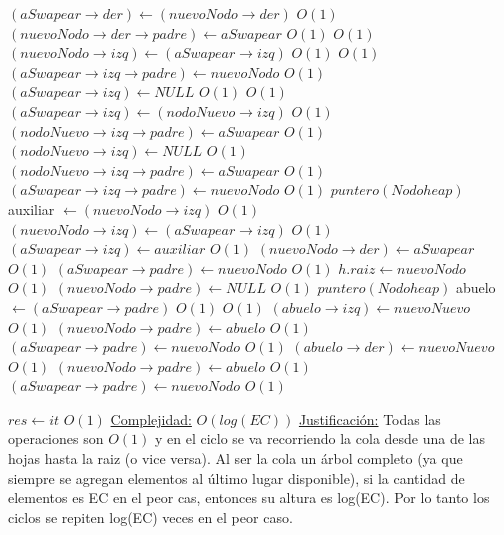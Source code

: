 \begin{Algoritmos}
\begin{algorithmic}[1]
							\Else
								\State $(aSwapear \rightarrow der) \gets (nuevoNodo \rightarrow der)$ \Comment $O(1)$
								\State $(nuevoNodo \rightarrow der \rightarrow padre) \gets aSwapear$ \Comment $O(1)$
							\EndIf
							 \Comment $O(1)$
								\State $(nuevoNodo \rightarrow izq) \gets (aSwapear \rightarrow izq)$ \Comment $O(1)$
								 \Comment $O(1)$
									\State $(aSwapear \rightarrow izq \rightarrow padre) \gets nuevoNodo$	\Comment $O(1)$						
								\EndIf
								\State $(aSwapear \rightarrow izq) \gets NULL$ \Comment $O(1)$
							\Else
								 \Comment $O(1)$
									\State $(aSwapear \rightarrow izq) \gets (nodoNuevo \rightarrow izq)$ \Comment $O(1)$
									\State $(nodoNuevo \rightarrow izq \rightarrow padre) \gets aSwapear$ \Comment $O(1)$
									\State $(nodoNuevo \rightarrow izq) \gets NULL$ \Comment $O(1)$
								\Else
									\State $(nodoNuevo \rightarrow izq \rightarrow padre) \gets aSwapear$ \Comment $O(1)$
									\State $(aSwapear \rightarrow izq \rightarrow padre) \gets nuevoNodo$ \Comment $O(1)$
									\State $puntero(Nodoheap)$ auxiliar $\gets (nuevoNodo \rightarrow izq)$ \Comment $O(1)$
									\State $(nuevoNodo \rightarrow izq) \gets (aSwapear \rightarrow izq)$ \Comment $O(1)$
									\State $(aSwapear \rightarrow izq) \gets auxiliar$ \Comment $O(1)$
								\EndIf
							\EndIf
						\State $(nuevoNodo \rightarrow der) \gets aSwapear$ \Comment $O(1)$
					\EndIf	
					\State $(aSwapear \rightarrow padre) \gets nuevoNodo$ \Comment $O(1)$
					\State $h.raiz \gets nuevoNodo$	 \Comment $O(1)$
					\State $(nuevoNodo \rightarrow padre) \gets NULL$			 \Comment $O(1)$
					\Else
					\State $puntero(Nodoheap)$ abuelo $\gets (aSwapear \rightarrow padre)$ \Comment $O(1)$
						 \Comment $O(1)$
							\State $(abuelo \rightarrow izq) \gets nuevoNuevo$ \Comment $O(1)$
							\State $(nuevoNodo \rightarrow padre) \gets abuelo$ \Comment $O(1)$
							\State $(aSwapear \rightarrow padre) \gets nuevoNodo$ \Comment $O(1)$
						\Else
							\State $(abuelo \rightarrow der) \gets nuevoNuevo$ \Comment $O(1)$
							\State $(nuevoNodo \rightarrow padre) \gets abuelo$ \Comment $O(1)$
							\State $(aSwapear \rightarrow padre) \gets nuevoNodo$ \Comment $O(1)$
						\EndIf
					\EndIf
						
			\EndWhile
		\EndIf
		\State $res \gets it$ \Comment $O(1)$
			\medskip
			\Statex \underline{Complejidad:} $O(log(EC))$
			\Statex \underline{Justificaci\'on:} Todas las operaciones son $O(1)$ y en el ciclo se va recorriendo la cola desde una de las hojas hasta la raiz (o vice versa). Al ser la cola un \'arbol completo (ya que siempre se agregan elementos al \'ultimo lugar disponible), si la cantidad de elementos es EC en el peor cas, entonces su altura es log(EC). Por lo tanto los ciclos se repiten log(EC) veces en el peor caso.
    	\end{algorithmic}   	



\end{Algoritmos}
